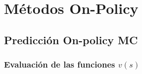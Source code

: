 \documentclass[10pt, envcountsect, handout, aspectratio=1610, hyperref={hypertexnames=true}]{beamer}
\begin{document}
\section{Métodos On-Policy}




\subsection{Predicción On-policy MC}





\subsubsection{Evaluación de las funciones $v(s)$}
\end{document}
